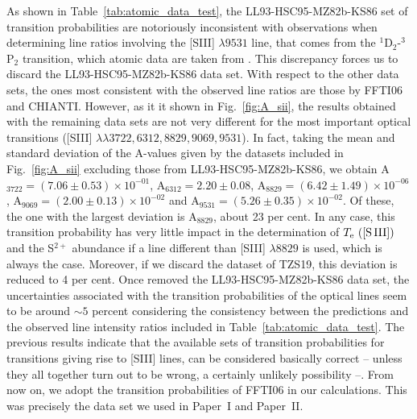 \documentclass[fleqn,usenatbib]{mnras}
\begin{document}
As shown in Table~\ref{tab:atomic_data_test}, the LL93-HSC95-MZ82b-KS86 set of  transition probabilities are notoriously inconsistent with observations when determining line ratios involving the [S\thinspace III] $\lambda 9531$ line, that comes from the $^1$D$_2$-$^3$P$_2$ transition, which atomic data are taken from \citet{KS86}. This discrepancy forces us to discard   the LL93-HSC95-MZ82b-KS86 data set. With respect to the other data sets, the ones most consistent  with the observed line ratios are those by FFTI06 and CHIANTI. However, as it it shown in Fig.~\ref{fig:A_sii}, the results obtained with the remaining data sets are not very different for the most important optical transitions ([S\thinspace III] $\lambda \lambda 3722, 6312, 8829, 9069, 9531$). In fact, taking the mean and standard deviation of the A-values given by the datasets included in Fig.~\ref{fig:A_sii} excluding those from LL93-HSC95-MZ82b-KS86, we obtain A$_{3722}=(7.06 \pm 0.53) \times 10^{-01}$, A$_{6312}=2.20 \pm 0.08$, A$_{8829}=(6.42 \pm 1.49) \times 10^{-06}$, A$_{9069}=(2.00 \pm 0.13) \times 10^{-02}$ and A$_{9531}=(5.26 \pm 0.35) \times 10^{-02}$. Of these, the one with the largest deviation is A$_{8829}$, about 23 per cent. In any case, this transition probability has very little impact in the determination of $T_{\rm e} \text{ ([S\thinspace III])}$ and the S$^{2+}$ abundance if a line different than [S\thinspace III] $\lambda 8829$ is used, which is always the case. Moreover, if we discard the dataset of TZS19, this deviation is reduced to 4 per cent. Once removed the LL93-HSC95-MZ82b-KS86 data set, the uncertainties associated with the transition probabilities of the optical lines seem to be around $\sim 5$ percent considering the consistency between the predictions and the observed line intensity ratios included in  Table~\ref{tab:atomic_data_test}. The previous results indicate that the available sets of transition probabilities for transitions giving rise to [S\thinspace III] lines, can be considered basically correct -- unless they all together turn out to be wrong, a certainly unlikely possibility --. From now on, we adopt the transition probabilities of FFTI06 in our calculations. This was precisely the data set we used in Paper~I and Paper~II.
\end{document}
